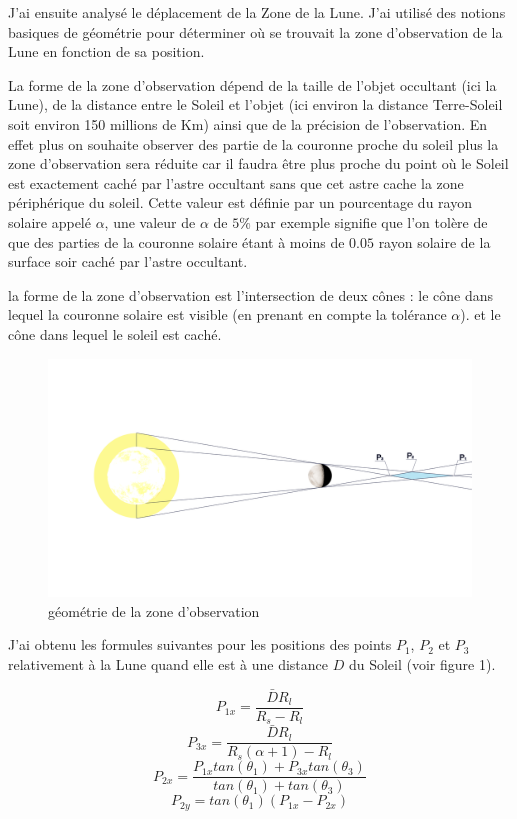 \documentclass[12pt]{article} %
\begin{document}
		J'ai ensuite analysé le déplacement de la \gls{Zone} de la Lune. J'ai utilisé des notions basiques de géométrie pour déterminer où se trouvait la zone d'observation de la Lune en fonction de sa position.
		
		La forme de la zone d'observation dépend de la taille de l'objet occultant (ici la Lune), de la distance entre le Soleil et l'objet (ici environ la distance Terre-Soleil soit environ 150 millions de Km) ainsi que de la précision de l'observation. En effet plus on souhaite observer des partie de la couronne proche du soleil plus la zone d'observation sera réduite car il faudra être plus proche du point où le Soleil est exactement caché par l'astre occultant sans que cet astre cache la zone périphérique du soleil. Cette valeur est définie par un pourcentage du rayon solaire appelé $\alpha$, une valeur de $\alpha$ de $5\%$ par exemple signifie que l'on tolère de que des parties de la couronne solaire étant à moins de $0.05$ rayon solaire de la surface soir caché par l'astre occultant.
		
		la forme de la zone d'observation est l'intersection de deux cônes : le cône dans lequel la couronne solaire est visible (en prenant en compte la tolérance $\alpha$). et le cône dans lequel le soleil est caché.
		
		\begin{figure}[H]
			\includegraphics[width=1\textwidth]{images/moon_schem.png}
			\caption{géométrie de la zone d'observation}
		\end{figure}
		
		J'ai obtenu les formules suivantes pour les positions des points $P_1$, $P_2$ et $P_3$ relativement à la Lune quand elle est à une distance $D$ du Soleil (voir figure 1).
		
		$$	
		P_{1x}=\frac{\bar{D}R_l}{R_s-R_l}
		$$ 
		$$	
		P_{3x}=\frac{\bar{D}R_l}{R_s(\alpha+1)-R_l}
		$$
		$$
		P_{2x}=\frac{P_{1x}tan(\theta_1) + P_{3x}tan(\theta_3)}{tan(\theta_1) + tan(\theta_3)}
		$$
		$$
		P_{2y}=tan(\theta_1)(P_{1x}-P_{2x})
		$$
		
\end{document}

